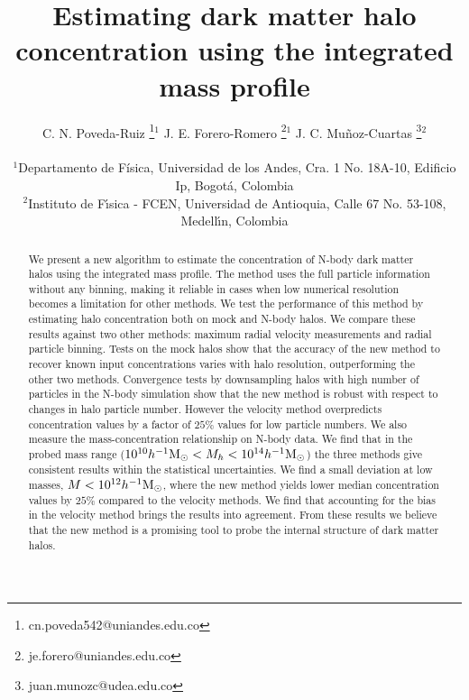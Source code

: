 \documentclass[a4,useAMS,usenatbib,usegraphicx]{mn2e}
\newcommand{\hMsun}{{\ifmmode{h^{-1}{\rm {M_{\odot}}}}\else{$h^{-1}{\rm{M_{\odot}}}$}\fi}}
\begin{document}
\title[Halo concentration via the integrated mass profile]{Estimating dark matter  halo concentration using the integrated mass profile} 
\author[C.N. Poveda-Ruiz, J.E. Forero-Romero, J.C. Mu\~noz-Cuartas]{
\parbox[t]{\textwidth}{\raggedright 
  C. N. Poveda-Ruiz \thanks{cn.poveda542@uniandes.edu.co}$^{1}$
  J. E. Forero-Romero \thanks{je.forero@uniandes.edu.co}$^{1}$
  J. C. Mu\~noz-Cuartas \thanks{juan.munozc@udea.edu.co}$^{2}$
}
\vspace*{6pt}\\
$^1$Departamento de F\'{i}sica, Universidad de los Andes, Cra. 1
No. 18A-10, Edificio Ip, Bogot\'a, Colombia\\
$^2$Instituto de F\'{\i}sica - FCEN, Universidad de Antioquia, Calle
67 No. 53-108, Medell\'{\i}n, Colombia
}

\maketitle

\begin{abstract}
We present a new algorithm to estimate the concentration of N-body
dark matter halos using the integrated mass profile.
The method uses the full particle information without any binning,
making it reliable in cases when low numerical resolution becomes a
limitation for other methods.   
We test the performance of this method by estimating halo
concentration both on mock and N-body halos. 
We compare these results against two other methods:
maximum radial velocity measurements and radial particle binning.
Tests on the mock halos show that the accuracy of the new method to
recover known input concentrations varies with halo resolution,
outperforming the other two methods. 
Convergence tests by downsampling halos with high number of particles in
the N-body simulation show that the new method is robust with respect
to changes in halo particle number.
However the velocity method overpredicts concentration values by a
factor of $25\%$ values for low particle numbers.
We also measure the mass-concentration relationship on N-body
data. 
We find that in the probed mass range ($10^{10}\hMsun < M_{h} <
10^{14}\hMsun$) the three methods give consistent results within the
statistical uncertainties.   
We find a small deviation at low masses, $M<10^{12}\hMsun$, where
the new method yields lower median concentration values by $25\%$
compared to the velocity methods. 
We find that accounting for the bias
in the velocity method brings the results into agreement.
From these results we believe that the new method is a promising tool
to probe the internal structure of dark matter halos.
\end{abstract}
\end{document}
